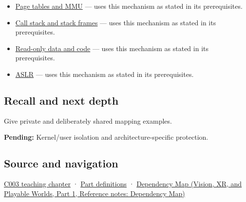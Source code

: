 \hypertarget{appendix-c2a9ad1e2b49-used-by}{}

\begin{itemize}
\tightlist
\item
  \hyperref[appendix-01e5905165c4]{Page tables and MMU} --- uses this mechanism as stated in its prerequisites.
\item
  \hyperref[appendix-b081b7abe193]{Call stack and stack frames} --- uses this mechanism as stated in its prerequisites.
\item
  \hyperref[appendix-5f9e5e2f0a5e]{Read-only data and code} --- uses this mechanism as stated in its prerequisites.
\item
  \hyperref[appendix-78cb248c8355]{ASLR} --- uses this mechanism as stated in its prerequisites.
\end{itemize}

\subsection{Recall and next depth}\label{appendix-c2a9ad1e2b49-recall-and-next-depth}

\hypertarget{appendix-c2a9ad1e2b49-recall-and-next-depth}{}

Give private and deliberately shared mapping examples.

\textbf{Pending:} Kernel/user isolation and architecture-specific protection.

\subsection{Source and navigation}\label{appendix-c2a9ad1e2b49-source-and-navigation}

\hypertarget{appendix-c2a9ad1e2b49-source-and-navigation}{}

\hyperref[01-foundations-i-ch002-where-the-bytes-live]{C003 teaching chapter} · \hyperref[appendix-fd090d982a15-m003---parts-41-60]{Part definitions} · \href{../07-Vision-XR-and-Playable-Worlds-P01/main.pdf\#nameddest=appendix-4ad47bdd269a}{Dependency Map (Vision, XR, and Playable Worlds, Part 1, Reference notes: Dependency Map)}
